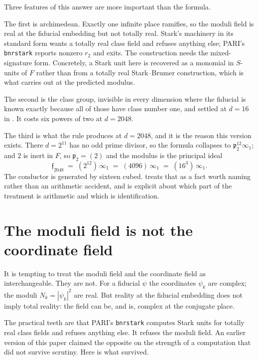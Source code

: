 \documentclass[12pt,a4paper]{article}
\newcommand{\Fd}{F}
\newcommand{\pt}{\mathfrak{p}_2}
\begin{document}
Three features of this answer are more important than the formula.

The first is archimedean. Exactly one infinite place ramifies, so the moduli
field is real at the fiducial embedding but not totally real. Stark's machinery
in its standard form wants a totally real class field and refuses anything else;
PARI's \texttt{bnrstark} reports nonzero $r_2$ and exits. The construction needs
the mixed-signature form. Concretely, a Stark unit here is recovered as a monomial
in $S$-units of $\Fd$ rather than from a totally real Stark--Brumer construction,
which is what  carries out at the predicted modulus.

The second is the class group, invisible in every dimension where the fiducial
is known exactly because all of those have class number one, and settled at
$d=16$ in . It costs six powers of two at $d=2048$.

The third is what the rule produces at $d=2048$, and it is the reason this
version exists. There $d = 2^{11}$ has no odd prime divisor, so the formula
collapses to $\pt^{12}\infty_1$; and $2$ is inert in $\Fd$, so $\pt = (2)$ and
the modulus is the principal ideal
\[
  \mathfrak{f}_{2048} \;=\; (2^{12})\,\infty_1 \;=\; (4096)\,\infty_1
  \;=\; (16^{3})\,\infty_1 .
\]
The conductor is generated by sixteen cubed.  treats that as a
fact worth naming rather than an arithmetic accident, and is explicit about
which part of the treatment is arithmetic and which is identification.

\section{The moduli field is not the coordinate field}
\label{sec:notcoord}

It is tempting to treat the moduli field and the coordinate field as
interchangeable. They are not. For a fiducial $\psi$ the coordinates $\psi_k$
are complex; the moduli $N_k = |\psi_k|^2$ are real. But reality at the fiducial
embedding does not imply total reality: the field can be, and is, complex at the
conjugate place.

The practical teeth are that PARI's \texttt{bnrstark} computes Stark units for
totally real class fields and refuses anything else. It refuses the moduli
field. An earlier version of this paper claimed the opposite on the strength of
a computation that did not survive scrutiny. Here is what survived.
\end{document}
